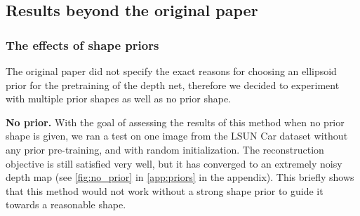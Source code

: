 \subsection{Results beyond the original paper}
\subsubsection{The effects of shape priors}
\label{sec:results_priors}
The original paper did not specify the exact reasons for choosing an ellipsoid prior for the pretraining of the depth net, therefore we decided to experiment with multiple prior shapes as well as no prior shape.

\textbf{No prior.} With the goal of assessing the results of this method when no prior shape is given, we ran a test on one image from the LSUN Car dataset without any prior pre-training, and with random initialization. The reconstruction objective is still satisfied very well, but it has converged to an extremely noisy depth map (see \autoref{fig:no_prior} in \autoref{app:priors} in the appendix). This briefly shows that this method would not work without a strong shape prior to guide it towards a reasonable shape.


